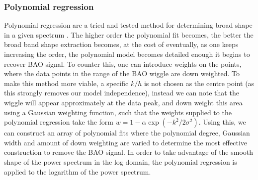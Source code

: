 \documentclass[iop,twocolappendix]{emulateapj}
\begin{document}
	\subsubsection{Polynomial regression}
	
	Polynomial regression are a tried and tested method for determining broad shape in a given spectrum \citep{baldry2014galaxy}. The higher order the polynomial fit becomes, the better the broad band shape extraction becomes, at the cost of eventually, as one keeps increasing the order, the polynomial model becomes detailed enough it begins to recover BAO signal. To counter this, one can introduce weights on the points, where the data points in the range of the BAO wiggle are down weighted. To make this method more viable, a specific $k/h$ is not chosen as the centre point (as this strongly removes our model independence), instead we can note that the wiggle will appear approximately at the data peak, and down weight this area using a Gaussian weighting function, such that the weights supplied to the polynomial regression take the form $w = 1 - \alpha \exp\left(-k^2/2 \sigma^2\right)$. Using this, we can construct an array of polynomial fits where the polynomial degree, Gaussian width and amount of down weighting are varied to determine the most effective construction to remove the BAO signal. In order to take advantage of the smooth shape of the power spectrum in the log domain, the polynomial regression is applied to the logarithm of the power spectrum.
	
\end{document}
